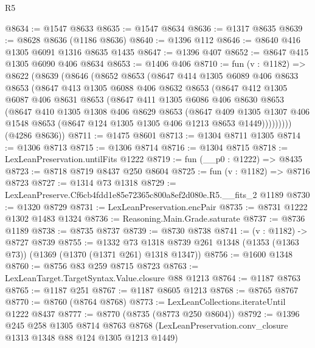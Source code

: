 \begin{lexlean}{R5}
\begin{coremodule}
@8634 := @1547 @8633
@8635 := @1547 @8634
@8636 := @1317 @8635
@8639 := @8628 @8636 (@1186 @8636)
@8640 := @1396 @112
@8646 := @8640 @416 @1305 @6091 @1316 @8635 @1435
@8647 := @1396 @407
@8652 := @8647 @415 @1305 @6090 @406 @8634
@8653 := @1406 @406
@8710 := fun (v : @1182) =>
  @8622
    (@8639
      (@8646
        (@8652
          @8653
          (@8647
            @414
            @1305
            @6089
            @406
            @8633
            @8653
            (@8647
              @413
              @1305
              @6088
              @406
              @8632
              @8653
              (@8647
                @412
                @1305
                @6087
                @406
                @8631
                @8653
                (@8647
                  @411
                  @1305
                  @6086
                  @406
                  @8630
                  @8653
                  (@8647
                    @410
                    @1305
                    @1308
                    @406
                    @8629
                    @8653
                    (@8647
                      @409
                      @1305
                      @1307
                      @406
                      @1548
                      @8653
                      (@8647 @124 @1305 @1305 @406 @1213 @8653 @1449)))))))))
      (@4286 @8636))
@8711 := @1475 @8601
@8713 := @1304 @8711 @1305
@8714 := @1306 @8713
@8715 := @1306 @8714
@8716 := @1304 @8715
@8718 := LexLeanPreservation.untilFits @1222
@8719 := fun (__p0 : @1222) => @8435
@8723 := @8718 @8719 @8437 @250 @8604
@8725 := fun (v : @1182) => @8716 @8723
@8727 := @1314 @73 @1318
@8729 := LexLeanPreserve.Cf6cb4fdd1e85e72365c800a8ef2d080e.R5.__fits_2 @1189
@8730 := @1320 @8729
@8731 := LexLeanPreservation.encPair
@8735 := @8731 @1222 @1302 @1483 @1324
@8736 := Reasoning.Main.Grade.saturate
@8737 := @8736 @1189
@8738 := @8735 @8737
@8739 := @8730 @8738
@8741 := (v : @1182) -> @8727 @8739
@8755 := @1332
    @73
    @1318
    @8739
    @261
    @1348
    (@1353 (@1363 @73))
    (@1369 (@1370 (@1371 @261) @1318 @1347))
@8756 := @1600 @1348
@8760 := @8756 @83 @259 @8715 @8723
@8763 := LexLeanTarget.TargetSyntax.Value.closure @88 @1213
@8764 := @1187 @8763
@8765 := @1187 @251
@8767 := @1187 @8605 @1213
@8768 := @8765 @8767
@8770 := @8760 (@8764 @8768)
@8773 := LexLeanCollections.iterateUntil @1222 @8437
@8777 := @8770 (@8735 (@8773 @250 @8604))
@8792 := @1396
    @245
    @258
    @1305
    @8714
    @8763
    @8768
    (LexLeanPreservation.conv_closure @1313 @1348 @88 @124 @1305 @1213 @1449)

\end{coremodule}
\end{lexlean}
